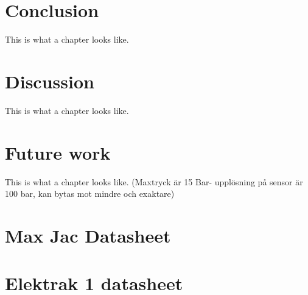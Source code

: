 \documentclass[a4paper,11pt]{kth-mag}
\begin{document}

\chapter{Conclusion}
This is what a chapter looks like.

\chapter{Discussion}
This is what a chapter looks like.
\chapter{Future work}
This is what a chapter looks like.
(Maxtryck är 15 Bar- upplösning på sensor är 100 bar, kan bytas mot mindre och exaktare)



\glsaddall

\appendix
\addappheadtotoc
\chapter{Max Jac Datasheet}
\label{appendix:Max_Jac}

\chapter{Elektrak 1 datasheet}
\label{appendix:Electrak_1}

\end{document}
